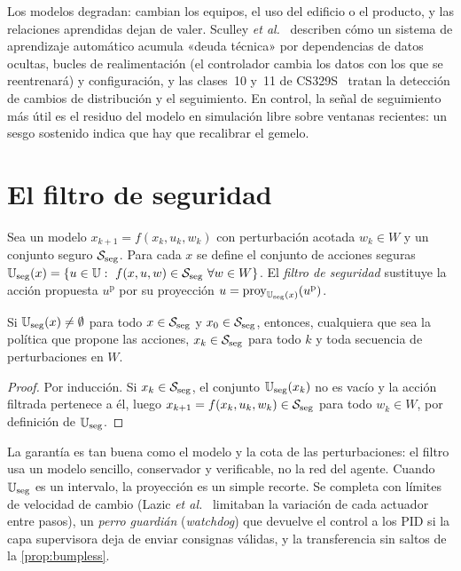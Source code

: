 Los modelos degradan: cambian los equipos, el uso del edificio o el producto, y las relaciones aprendidas dejan de valer. Sculley \emph{et al.}~\cite{sculley} describen cómo un sistema de aprendizaje automático acumula «deuda técnica» por dependencias de datos ocultas, bucles de realimentación (el controlador cambia los datos con los que se reentrenará) y configuración, y las clases~10 y~11 de CS329S~\cite{cs329s} tratan la detección de cambios de distribución y el seguimiento. En control, la señal de seguimiento más útil es el residuo del modelo en simulación libre sobre ventanas recientes: un sesgo sostenido indica que hay que recalibrar el gemelo.

\section{El filtro de seguridad}

\begin{definicion}\label{def:filtro}
Sea un modelo $x_{k+1}=f(x_k,u_k,w_k)$ con perturbación acotada $w_k\in W$ y un conjunto seguro $\mathcal{S}_{\mathrm{seg}}$. Para cada $x$ se define el conjunto de acciones seguras $\Uset_{\mathrm{seg}}(x)=\{u\in\Uset:\ f(x,u,w)\in\Sset_{\mathrm{seg}}\ \forall w\in W\}$. El \emph{filtro de seguridad} sustituye la acción propuesta $u^{\mathrm{p}}$ por su proyección $u=\operatorname{proy}_{\mathbb{U}_{\mathrm{seg}}(x)}(u^{\mathrm{p}})$.
\end{definicion}

\begin{proposicion}\label{prop:invariancia}
Si $\mathbb{U}_{\mathrm{seg}}(x)\ne\emptyset$ para todo $x\in\mathcal{S}_{\mathrm{seg}}$ y $x_0\in\mathcal{S}_{\mathrm{seg}}$, entonces, cualquiera que sea la política que propone las acciones, $x_k\in\mathcal{S}_{\mathrm{seg}}$ para todo $k$ y toda secuencia de perturbaciones en $W$.
\end{proposicion}

\begin{proof}
Por inducción. Si $x_k\in\mathcal{S}_{\mathrm{seg}}$, el conjunto $\mathbb{U}_{\mathrm{seg}}(x_k)$ no es vacío y la acción filtrada pertenece a él, luego $x_{k+1}=f(x_k,u_k,w_k)\in\mathcal{S}_{\mathrm{seg}}$ para todo $w_k\in W$, por definición de $\mathbb{U}_{\mathrm{seg}}$.
\end{proof}

La garantía es tan buena como el modelo y la cota de las perturbaciones: el filtro usa un modelo sencillo, conservador y verificable, no la red del agente. Cuando $\mathbb{U}_{\mathrm{seg}}$ es un intervalo, la proyección es un simple recorte. Se completa con límites de velocidad de cambio (Lazic \emph{et al.}~\cite{lazic} limitaban la variación de cada actuador entre pasos), un \emph{perro guardián} (\emph{watchdog}) que devuelve el control a los PID si la capa supervisora deja de enviar consignas válidas, y la transferencia sin saltos de la \cref{prop:bumpless}.

